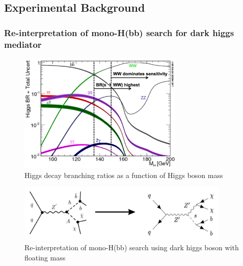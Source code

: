 \documentclass[12pt]{article}
\begin{document}
\subsection{Experimental Background}
\subsubsection{Re-interpretation of mono-H(bb) search for dark higgs mediator}
\begin{figure}[H]
	\centering
	\includegraphics[width=0.7\textwidth]{figures/BR_vs_mass.png}
	\caption{Higgs decay branching ratios as a function of Higgs boson mass}
	\label{fig:higgsbrs}
\end{figure}
\begin{figure}[H]
	\centering
	\includegraphics[width=0.9\textwidth]{figures/monohbb_reinterpretation.png}
	\caption{Re-interpretation of mono-H(bb) search using dark higgs boson with floating mass}
	\label{fig:monohbbreinterp}
\end{figure}
\end{document}
